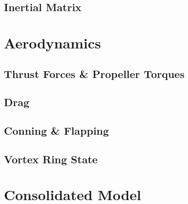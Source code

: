 \subsection{Inertial Matrix}
\label{subsec:dynamics.nonlinearities.inertia}

\section{Aerodynamics}
\label{sec:dynamics.aero}
\subsection{Thrust Forces \& Propeller Torques}
\label{subsec:dynamics.aero.bem}
\subsection{Drag}
\label{subsec:dynamics.aero.drag}
\subsection{Conning \& Flapping}
\label{subsec:dynamics.aero.flap}
\subsection{Vortex Ring State}
\label{subsec:dynamics.aero.vrs}

\section{Consolidated Model}
\label{sec:dynamics.model}